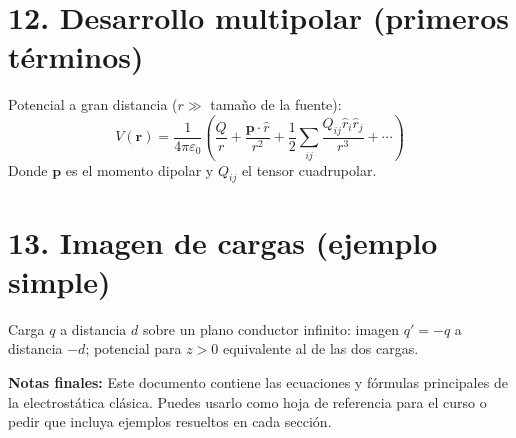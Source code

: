 \section*{12. Desarrollo multipolar (primeros t\'erminos)}
Potencial a gran distancia ($r\gg$ tama\~no de la fuente):
\begin{equation}
V(\mathbf{r})=\dfrac{1}{4\pi\varepsilon_0}\left(\dfrac{Q}{r}+\dfrac{\mathbf{p}\cdot\hat{r}}{r^{2}}+\dfrac{1}{2}\sum_{ij} \dfrac{Q_{ij}\hat{r}_i\hat{r}_j}{r^{3}}+\cdots\right)
\end{equation}
Donde $\mathbf{p}$ es el momento dipolar y $Q_{ij}$ el tensor cuadrupolar.


\section*{13. Imagen de cargas (ejemplo simple)}
Carga $q$ a distancia $d$ sobre un plano conductor infinito: imagen $q'=-q$ a distancia $-d$; potencial para $z>0$ equivalente al de las dos cargas.


\vspace{6pt}
\noindent\textbf{Notas finales:} Este documento contiene las ecuaciones y fórmulas principales de la electrostática clásica. Puedes usarlo como hoja de referencia para el curso o pedir que incluya ejemplos resueltos en cada sección.


